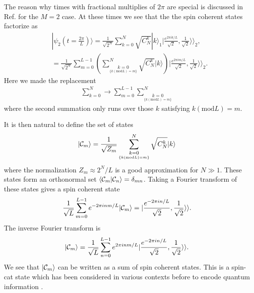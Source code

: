 \documentclass[%
  prx,%
  twocolumn,%
  preprintnumbers,%
  amsmath,%
  amssymb,%
  superscriptaddress%
]{revtex4}
\begin{document}
The reason why times with fractional multiplies of $ 2 \pi  $ are special is discussed in Ref.  \cite{byrnes2013fractality} for the $M = 2 $ case.  At these times we see that the the spin coherent states factorize as
%
\begin{align}
&|\psi_2 (t= \frac{2\pi}{L} )  \rangle=\frac{1}{\sqrt{2^N}}\sum_{k=0}^N \sqrt{C_{N}^{k}}|k\rangle_1  |\frac{e^{2 \pi i k/L }}{\sqrt{2}},\frac{1}{\sqrt{2}}\rangle\rangle_2 ,  \label{firstlinepsi2} \\
& = \frac{1}{\sqrt{2^N}} \sum_{m=0}^{L-1} \left(  \sum^N_{  \underset{  \{ k (\text{mod} L ) =m \} }{k=0} }   \sqrt{C_{N}^{k}}|k\rangle  \right)  |\frac{e^{2 \pi i m/L }}{\sqrt{2}},\frac{1}{\sqrt{2}}\rangle\rangle_2 .
\label{M2psiv2}
\end{align}
%
Here we made the replacement
%
\begin{align}
\sum_{k=0}^N \rightarrow \sum_{m=0}^{L-1} \sum^N_{  \underset{  \{ k (\text{mod} L ) =m \} }{k=0} } 
\end{align}
%
where the second summation only runs over those $ k $ satisfying $ k (\text{mod} L) = m $. 

It is then natural to define the set of states
%
\begin{align}
|{\cal C}_m \rangle = \frac{1}{\sqrt{Z_m}}  \sum^N_{  \underset{  \{ k (\text{mod} L ) =m \} }{k=0} }  \sqrt{C_{N}^{k}}|k\rangle 
\end{align}
%
where the normalization $ Z_m \approx 2^N/L $ is a good approximation for $ N \gg 1 $.  These states form an orthonormal set $ \langle {\cal C}_m | {\cal C}_n \rangle = \delta_{mn} $. Taking a Fourier transform of these states gives a spin coherent state
%
\begin{align}
\frac{1}{\sqrt{L}} \sum_{m=0}^{L-1} e^{-2 \pi i n m/L } |{\cal C}_m \rangle  =| \frac{e^{-2 \pi i n /L }}{\sqrt{2}}, \frac{1}{\sqrt{2}} \rangle \rangle . 
\end{align}
%
The inverse Fourier transform is
%
\begin{align}
|{\cal C}_m \rangle = \frac{1}{\sqrt{L}} \sum_{n=0}^{L-1} 
e^{2 \pi i n m/L } | \frac{e^{-2 \pi i n /L }}{\sqrt{2}}, \frac{1}{\sqrt{2}} \rangle \rangle .
\label{invfouriercat}
\end{align}
%
We see that $ |{\cal C}_m \rangle$ can be written as a sum of spin coherent states.  This is a spin-cat state which has been considered in various contexts before to encode quantum information \cite{agarwal1997atomic,semenenko2016implementing,qin2021generating,omanakuttan2024fault}.  
\end{document}
